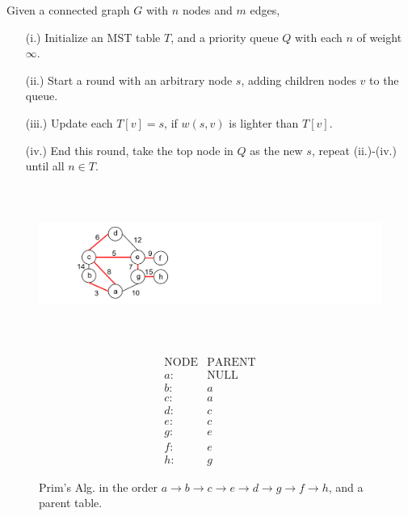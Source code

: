 \vspace{-1em}
\begin{theo}

    Given a connected graph $G$ with $n$ nodes and $m$ edges,
    \begin{enumerate}
        \item [(i.)] Initialize an MST table $T$, and a priority queue $Q$ with each $n$ of weight $\infty$.
        \item [(ii.)] Start a round with an arbitrary node $s$, adding children nodes $v$ to the queue.
        \item [(iii.)] Update each $T[v]=s$, if $w(s,v)$ is lighter than $T[v]$.
        \item [(iv.)] End this round, take the top node in $Q$ as the new $s$, repeat (ii.)-(iv.) until all $n\in T$.
    \end{enumerate}
    \noindent

\end{theo}

\vspace{-2em}
\begin{figure}[h]
    \centering
    \hfill
    \begin{minipage}{0.45\textwidth}
        \centering

        \vspace{2em}
      
        \includegraphics[height=2in]{./Sections/spanning/prims_order.png}
        
    \end{minipage}%
    \hfill
    \begin{minipage}{0.45\textwidth}
        \centering

        \vspace{2em}
        $$ \begin{matrix} 
        \text{NODE} & \text{PARENT}\\
        a: & \text{NULL}\\ 
        b: & a\\ 
        c: & a\\ 
        d: & c\\ 
        e: & c\\ 
        g: & e\\ 
        f: & e\\ 
        h: & g 
        \end{matrix} $$
    \end{minipage}
    \hfill 
    \caption{Prim's Alg. in the order $a\to b \to c \to e \to d \to g \to f \to h$, and a parent table.}
    \label{fig:prim_example}
\end{figure}

